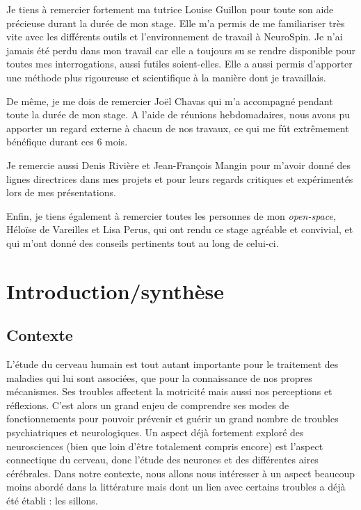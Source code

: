 \documentclass[12pt, oneside, a4paper, titlepage]{article}
\begin{document}
Je tiens à remercier fortement ma tutrice Louise Guillon pour toute son aide précieuse durant la durée de mon stage. Elle m’a permis de me familiariser très vite avec les différents outils et l’environnement de travail à NeuroSpin. Je n’ai jamais été perdu dans mon travail car elle a toujours su se rendre disponible pour toutes mes interrogations, aussi futiles soient-elles. Elle a aussi permis d’apporter une méthode plus rigoureuse et scientifique à la manière dont je travaillais.

\vspace{5mm} %


De même, je me dois de remercier Joël Chavas qui m’a accompagné pendant toute la durée de mon stage. A l’aide de réunions hebdomadaires, nous avons pu apporter un regard externe à chacun de nos travaux, ce qui me fût extrêmement bénéfique durant ces 6 mois.

\vspace{5mm} %

Je remercie aussi Denis Rivière et Jean-François Mangin pour m’avoir donné des lignes directrices dans mes projets et pour leurs regards critiques et expérimentés lors de mes présentations.

\vspace{5mm} %

Enfin, je tiens également à remercier toutes les personnes de mon \textit{open-space}, Héloïse de Vareilles et Lisa Perus, qui ont rendu ce stage agréable et convivial, et qui m’ont donné des conseils pertinents tout au long de celui-ci.


\newpage
\section{Introduction/synthèse }

\vspace{2cm} 

\subsection{Contexte }

L'étude du cerveau humain est tout autant importante pour le traitement des maladies qui lui sont associées, que pour la connaissance de nos propres mécanismes. Ses troubles affectent la motricité mais aussi nos perceptions et réflexions. C'est alors un grand enjeu de comprendre ses modes de fonctionnements pour pouvoir prévenir et guérir un grand nombre de troubles psychiatriques et neurologiques.
Un aspect déjà fortement exploré des neurosciences (bien que loin d'être totalement compris encore) est l'aspect connectique du cerveau, donc l'étude des neurones et des différentes aires cérébrales. Dans notre contexte, nous allons nous intéresser à un aspect beaucoup moins abordé dans la littérature mais dont un lien avec certains troubles a déjà été établi : les sillons.
\end{document}
